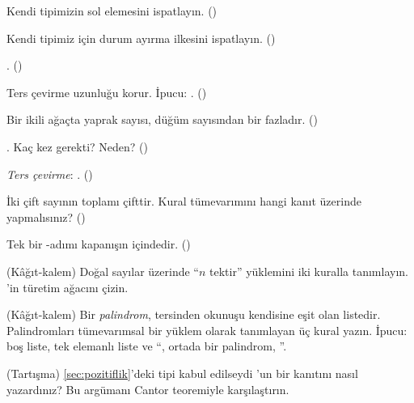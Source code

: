 \begin{alistirmalar}
 Kendi  tipimizin sol elemesini ispatlayın. ()

 Kendi  tipimiz için durum ayırma ilkesini
ispatlayın. ()

 . ()

 Ters çevirme uzunluğu korur. İpucu: .
()

 Bir ikili ağaçta yaprak sayısı, düğüm sayısından bir
fazladır. ()

 . Kaç kez  gerekti? Neden?
()

 \emph{Ters çevirme}: .
()

 İki çift sayının toplamı çifttir. Kural tümevarımını hangi
kanıt üzerinde yapmalısınız? ()

 Tek bir -adımı kapanışın içindedir. ()

 (Kâğıt-kalem) Doğal sayılar üzerinde ``$n$ tektir''
yüklemini iki kuralla tanımlayın. 'in türetim ağacını çizin.

 (Kâğıt-kalem) Bir \emph{palindrom}, tersinden okunuşu
kendisine eşit olan listedir. Palindromları tümevarımsal bir yüklem
olarak tanımlayan üç kural yazın. İpucu: boş liste, tek elemanlı liste
ve ``, ortada bir palindrom, ''.

 (Tartışma) \cref{sec:pozitiflik}'deki  tipi
kabul edilseydi 'un bir kanıtını nasıl yazardınız? Bu argümanı
Cantor teoremiyle karşılaştırın.
\end{alistirmalar}
